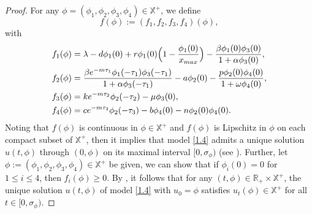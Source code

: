 \documentclass[10pt,a4paper]{amsart}
\numberwithin{equation}{section}
\begin{document}
\begin{proof}
For any $\phi=(\phi_1,\phi_2,\phi_3,\phi_4) \in \mathbb{X}^+$, we define
$$
f(\phi):=(f_1, f_2, f_3, f_4)(\phi),
$$
with
\begin{align*}
f_1(\phi)&=  \lambda-d\phi_1(0)+r\phi_1(0)\Big(1-\frac{\phi_1(0)}{x_{\rm max}}\Big)- \frac{{\beta }\phi_1(0)\phi_3(0)}{1+\alpha\phi_3(0)},\\
f_2(\phi)&=  \frac{\beta e^{-m\tau_1}\phi_1(-\tau_{1})\phi_3(-\tau_{1})}{1+\alpha\phi_3(-\tau_{1})}-a\phi_2(0)-\frac{p\phi_2(0)\phi_4(0)}{1+\omega\phi_4(0)},\\
f_3(\phi)&=ke^{-m\tau_2}\phi_2(-\tau_{2})-\mu\phi_3(0),\\
f_4(\phi)&=ce^{-m\tau_3}\phi_2(-\tau_3)-b\phi_4(0)-n\phi_2(0)\phi_4(0).
\end{align*}
Noting that $f(\phi)$ is continuous in  $\phi\in \mathbb{X}^+$ and
$f(\phi)$ is Lipschitz in $\phi$ on each compact subset of $\mathbb{X}^+$,  
then it implies that model \eqref{1.4} admits a unique solution $u(t,\phi)$ 
through $(0,\phi)$
on its maximal interval $[0, \sigma_{\phi})$  
(see \cite[Theorem 2.2.1 and Theorem 2.2.3]{HV}). Further, let
$\phi:= (\phi_1, \phi_2, \phi_3, \phi_4)\in \mathbb{X}^+$ be given, we can show 
that if $\phi_i(0)=0$ for $1\leq i\leq 4$, then $f_i(\phi)\geq 0$.
By \cite[Theorem 5.2.1 Remark 5.2.1]{S}, it follows that for any 
$(t, \phi)\in \mathbb{R}_+\times \mathbb{X}^+$, the unique solution $u(t,\phi)$
of  model \eqref{1.4} with $u_0=\phi$  satisfies $u_t(\phi)\in \mathbb{X}^+$ for all 
$t\in [0, \sigma_{\phi})$.


\end{proof}
\end{document}
